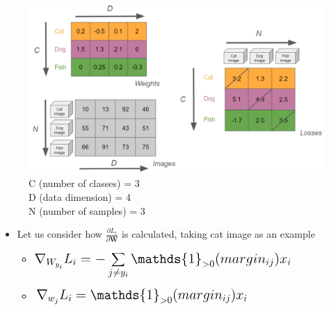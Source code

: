\documentclass{article}
\begin{document}
\begin{figure}[htp]
    \centering
    \includegraphics[width=12cm, scale=1]{images/overView.PNG}
    \captionsetup{justification=centering}
    \caption{C (number of classes) = 3\\
             D (data dimension) = 4\\
             N (number of samples) = 3}
\end{figure}

\begin{itemize}
    \item Let us consider how $\frac{\partial L_{i}}{\partial \boldsymbol{W}}$ is calculated, taking cat image as an example
        \begin{itemize}
            \item $\mathlarger{\mathlarger{\mathlarger{\nabla_{W_{y_{i}}}L_{i} = -\sum\limits_{j \neq y_{i}}\mathds{1}_{>0}(margin_{ij})x_{i}}}}$
            \item $\mathlarger{\mathlarger{\mathlarger{\nabla_{w_{j}}L_{i} = \mathds{1}_{>0}(margin_{ij})x_{i}}}}$
        \end{itemize}
\end{itemize}
\end{document}
